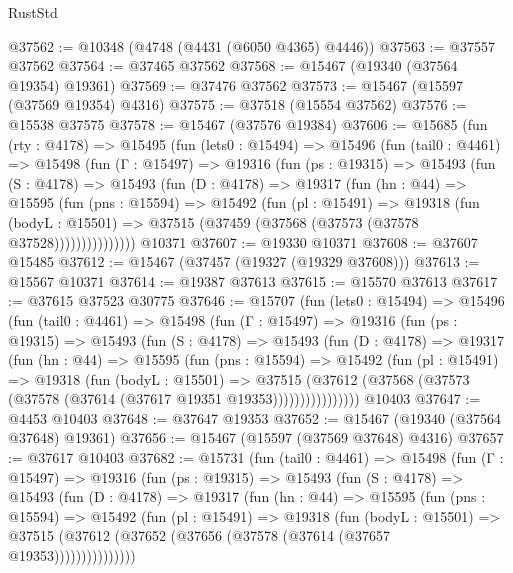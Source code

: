 \begin{lexlean}{RustStd}
\begin{coremodule}
@37562 := @10348 (@4748 (@4431 (@6050 @4365) @4446))
@37563 := @37557 @37562
@37564 := @37465 @37562
@37568 := @15467 (@19340 (@37564 @19354) @19361)
@37569 := @37476 @37562
@37573 := @15467 (@15597 (@37569 @19354) @4316)
@37575 := @37518 (@15554 @37562)
@37576 := @15538 @37575
@37578 := @15467 (@37576 @19384)
@37606 := @15685
    (fun (rty : @4178) =>
    @15495
      (fun (lets0 : @15494) =>
      @15496
        (fun (tail0 : @4461) =>
        @15498
          (fun (Γ : @15497) =>
          @19316
            (fun (ps : @19315) =>
            @15493
              (fun (S : @4178) =>
              @15493
                (fun (D : @4178) =>
                @19317
                  (fun (hn : @44) =>
                  @15595
                    (fun (pns : @15594) =>
                    @15492
                      (fun (pl : @15491) =>
                      @19318
                        (fun (bodyL : @15501) =>
                        @37515 (@37459 (@37568 (@37573 (@37578 @37528)))))))))))))))
    @10371
@37607 := @19330 @10371
@37608 := @37607 @15485
@37612 := @15467 (@37457 (@19327 (@19329 @37608)))
@37613 := @15567 @10371
@37614 := @19387 @37613
@37615 := @15570 @37613
@37617 := @37615 @37523 @30775
@37646 := @15707
    (fun (lets0 : @15494) =>
    @15496
      (fun (tail0 : @4461) =>
      @15498
        (fun (Γ : @15497) =>
        @19316
          (fun (ps : @19315) =>
          @15493
            (fun (S : @4178) =>
            @15493
              (fun (D : @4178) =>
              @19317
                (fun (hn : @44) =>
                @15595
                  (fun (pns : @15594) =>
                  @15492
                    (fun (pl : @15491) =>
                    @19318
                      (fun (bodyL : @15501) =>
                      @37515
                        (@37612
                          (@37568 (@37573 (@37578 (@37614 (@37617 @19351 @19353))))))))))))))))
    @10403
@37647 := @4453 @10403
@37648 := @37647 @19353
@37652 := @15467 (@19340 (@37564 @37648) @19361)
@37656 := @15467 (@15597 (@37569 @37648) @4316)
@37657 := @37617 @10403
@37682 := @15731
    (fun (tail0 : @4461) =>
    @15498
      (fun (Γ : @15497) =>
      @19316
        (fun (ps : @19315) =>
        @15493
          (fun (S : @4178) =>
          @15493
            (fun (D : @4178) =>
            @19317
              (fun (hn : @44) =>
              @15595
                (fun (pns : @15594) =>
                @15492
                  (fun (pl : @15491) =>
                  @19318
                    (fun (bodyL : @15501) =>
                    @37515 (@37612 (@37652 (@37656 (@37578 (@37614 (@37657 @19353)))))))))))))))

\end{coremodule}
\end{lexlean}
